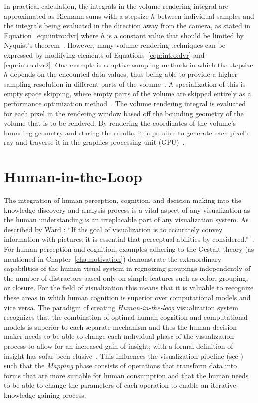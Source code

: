In practical calculation, the integrals in the volume rendering integral are approximated as Riemann sums with a stepsize $h$ between individual samples and the integrals being evaluated in the direction away from the camera, as stated in Equation~\ref{eqn:intro:dvr} where $h$ is a constant value that should be limited by Nyquist's theorem~\cite{shannon1949communication}.  However, many volume rendering techniques can be expressed by modifying elements of Equations~\ref{eqn:intro:dvr} and \ref{eqn:intro:dvr2}.  One example is adaptive sampling methods in which the stepsize $h$ depends on the encounted data values, thus being able to provide a higher sampling resolution in different parts of the volume~\cite{danskin1992fast}.  A specialization of this is empty space skipping, where empty parts of the volume are skipped entirely as a performance optimization method~\cite{yagel1993accelerating}.  The volume rendering integral is evaluated for each pixel in the rendering window based off the bounding geometry of the volume that is to be rendered.  By rendering the coordinates of the volume's bounding geometry and storing the results, it is possible to generate each pixel's ray and traverse it in the graphics processing unit (GPU)~\cite{kruger2003acceleration}.

\section{Human-in-the-Loop} \label{cha:intro:hitl}
The integration of human perception, cognition, and decision making into the knowledge discovery and analysis process is a vital aspect of any visualization as the human understanding is an irreplacable part of any visualization system.  As described by Ward \etal : ``If the goal of visualization is to accurately convey information with pictures, it is essential that perceptual abilities by considered.''~\cite{ward2010interactive}.  For human perception and cognition, examples adhering to the Gestalt theory (as mentioned in Chapter~\ref{cha:motivation}) demonstrate the extraordinary capabilities of the human visual system in regnoizing groupings independently of the number of distractors based only on simple features such as color, grouping, or closure.  For the field of visualization this means that it is valuable to recognize these areas in which human cognition is superior over computational models and vice versa.  The paradigm of creating \emph{Human-in-the-loop} visualization system recognizes that the combination of optimal human cognition and computational models is superior to each separate mechanism and thus the human decision maker needs to be able to change each individual phase of the visualization process to allow for an increased gain of insight; with a formal definition of insight has sofar been elusive~\cite{north2006toward}.  This influences the visualization pipeline (see ) such that the \emph{Mapping} phase consists of operations that transform data into forms that are more suitable for human consumption and that the human needs to be able to change the parameters of each operation to enable an iterative knowledge gaining process.

